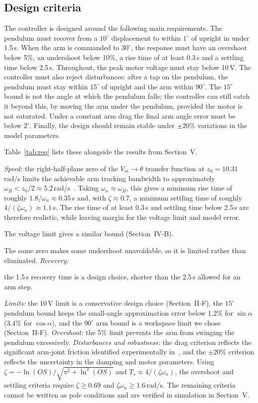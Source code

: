 \subsection{Design criteria}
The controller is designed around the following main requirements. The pendulum must recover from a $10^\circ$ displacement to within $1^\circ$ of upright in under 1.5\,s. When the arm is commanded to $30^\circ$, the response must have an overshoot below 5\%, an undershoot below 10\%, a rise time of at least 0.3\,s and a settling time below 2.5\,s. Throughout, the peak motor voltage must stay below 10\,V. The controller must also reject disturbances: after a tap on the pendulum, the pendulum must stay within $15^\circ$ of upright and the arm within $90^\circ$. The $15^\circ$ bound is not the angle at which the pendulum falls; the controller can still catch it beyond this, by moving the arm under the pendulum, provided the motor is not saturated. Under a constant arm drag the final arm angle error must be below $2^\circ$. Finally, the design should remain stable under $\pm20\%$ variations in the model parameters. \begin{rw}Table~\ref{tab:req} lists these alongside the results from Section~V.\end{rw}

\emph{Speed:} the right-half-plane zero of the $V_m\to\theta$ transfer function at $z_0=10.31$\,rad/s limits the achievable arm tracking bandwidth to approximately $\omega_B<z_0/2\approx5.2$\,rad/s~\cite{skogestad2005}. Taking $\omega_n\approx\omega_B$, this gives a minimum rise time of roughly $1.8/\omega_n\approx0.35$\,s and, with $\zeta\approx0.7$, a minimum settling time of roughly $4/(\zeta\omega_n)\approx1.1$\,s. The rise time of at least 0.3\,s and settling time below 2.5\,s are therefore realistic, while leaving margin for the voltage limit and model error. \begin{rw}The voltage limit gives a similar bound (Section~IV-B).\end{rw} The same zero makes some undershoot unavoidable, so it is limited rather than eliminated. \emph{Recovery:} \begin{rw}the 1.5\,s recovery time is a design choice, shorter than the 2.5\,s allowed for an arm step.\end{rw} \emph{Limits:} the 10\,V limit is a conservative design choice (Section~II-F), the $15^\circ$ pendulum bound keeps the small-angle approximation error below 1.2\% for $\sin\alpha$ (3.4\% for $\cos\alpha$), and the $90^\circ$ arm bound is a workspace limit we chose (Section~II-F). \emph{Overshoot:} the 5\% limit prevents the arm from swinging the pendulum excessively. \emph{Disturbances and robustness:} the drag criterion reflects the significant arm-joint friction identified experimentally in~\cite{gafvert1998}, and the $\pm20\%$ criterion reflects the uncertainty in the damping and motor parameters. Using $\zeta=-\ln(OS)/\sqrt{\pi^2+\ln^2(OS)}$ and $T_s\approx4/(\zeta\omega_n)$, the overshoot and settling criteria require $\zeta\ge0.69$ and $\zeta\omega_n\ge1.6$\,rad/s. The remaining criteria cannot be written as pole conditions and are verified in simulation in Section~V.


